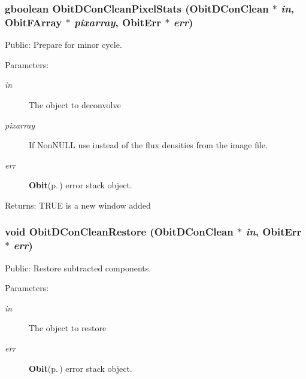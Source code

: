 \subsubsection{\setlength{\rightskip}{0pt plus 5cm}gboolean Obit\-DCon\-Clean\-Pixel\-Stats ({\bf Obit\-DCon\-Clean} $\ast$ {\em in}, {\bf Obit\-FArray} $\ast$ {\em pixarray}, {\bf Obit\-Err} $\ast$ {\em err})}\label{ObitDConClean_8c_a20}


Public: Prepare for minor cycle. 

\begin{Desc}
\item[Parameters:]
\begin{description}
\item[{\em in}]The object to deconvolve \item[{\em pixarray}]If Non\-NULL use instead of the flux densities from the image file. \item[{\em err}]{\bf Obit}{\rm (p.\,\pageref{structObit})} error stack object. \end{description}
\end{Desc}
\begin{Desc}
\item[Returns:]TRUE is a new window added \end{Desc}
\subsubsection{\setlength{\rightskip}{0pt plus 5cm}void Obit\-DCon\-Clean\-Restore ({\bf Obit\-DCon\-Clean} $\ast$ {\em in}, {\bf Obit\-Err} $\ast$ {\em err})}\label{ObitDConClean_8c_a24}


Public: Restore subtracted components. 

\begin{Desc}
\item[Parameters:]
\begin{description}
\item[{\em in}]The object to restore \item[{\em err}]{\bf Obit}{\rm (p.\,\pageref{structObit})} error stack object. \end{description}
\end{Desc}
